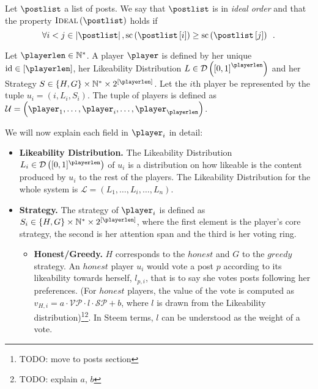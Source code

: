     \begin{definition}
      Let $\postlist$ a list of posts. We say that $\postlist$ is in
      \emph{ideal order} and that the property
      $\textsc{Ideal}\left(\postlist\right)$ holds if
      \begin{equation*}
        \forall i < j \in \left|\postlist\right|,
        \mathrm{sc}\left(\postlist\left[i\right]\right) \geq
        \mathrm{sc}\left(\postlist\left[j\right]\right) \enspace.
      \end{equation*}
    \end{definition}

    \begin{definition}[Player]
      Let $\playerlen \in \mathbb{N}^{*}$. A player $\player$ is defined by her
      unique $\mathrm{id} \in \left[\playerlen\right]$, her Likeability
      Distribution $L \in \mathcal{D} \left(\left[0, 1\right]^\playerlen\right)$
      and her Strategy $S \in \left\{H, G\right\} \times \mathbb{N}^* \times
      2^{\left[\playerlen\right]}$. Let the $i$th player be represented by the
      tuple $u_i = \left(i, L_i, S_i\right)$. The tuple of players is defined as
      $\mathcal{U} = \left(\player_1, \dots, \player_i, \dots,
      \player_\playerlen\right)$.

      We will now explain each field in $\player_i$ in detail:
      \begin{itemize}
        \item \textbf{Likeability Distribution.} The Likeability Distribution
        $L_i \in \mathcal{D}\left([0,1]^\playerlen\right)$ of $u_i$ is a
        distribution on how likeable is the content produced by $u_i$ to the
        rest of the players. The Likeability Distribution for the whole system
        is $\mathcal{L} = \left(L_1, \dots, L_i, \dots, L_n\right)$.

        \item \textbf{Strategy.} The strategy of $\player_i$ is defined as $S_i
        \in \lbrace H, G \rbrace \times \mathbb{N}^* \times
        2^{\left[\playerlen\right]}$, where the first element is the player's
        core strategy, the second is her attention span and the third is her
        voting ring.
        \begin{itemize}
          \item \textbf{Honest/Greedy.} $H$ corresponds to the $honest$ and $G$
          to the $greedy$ strategy. An $honest$ player $u_i$ would vote a post
          $p$ according to its likeability towards herself, $l_{p, i}$, that is
          to say she votes posts following her preferences. (For $honest$
          players, the value of the vote is computed as $v_{H,i} = a \cdot
          \mathcal{VP} \cdot l \cdot \mathcal{SP} + b$, where $l$ is drawn from
          the Likeability distribution)\footnote{TODO: move to posts
          section}\fnmsep\footnote{TODO: explain $a$, $b$}. In Steem terms, $l$
          can be understood as the weight of a vote.


\end{itemize}
\end{itemize}
\end{definition}
